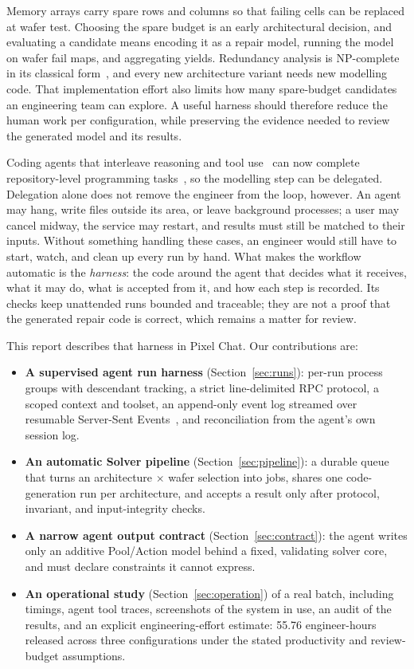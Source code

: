\documentclass[conference]{IEEEtran}
\begin{document}
Memory arrays carry spare rows and columns so that failing cells can be
replaced at wafer test. Choosing the spare budget is an early architectural
decision, and evaluating a candidate means encoding it as a repair model,
running the model on wafer fail maps, and aggregating yields. Redundancy
analysis is NP-complete in its classical form~\cite{kuo1987}, and every new
architecture variant needs new modelling code.
That implementation effort also limits how many spare-budget candidates an
engineering team can explore. A useful harness should therefore reduce the
human work per configuration, while preserving the evidence needed to
review the generated model and its results.

Coding agents that interleave reasoning and tool use~\cite{yao2023} can now
complete repository-level programming tasks~\cite{jimenez2024}, so the
modelling step can be delegated. Delegation alone does not remove the
engineer from the loop, however. An agent may hang, write files outside its
area, or leave background processes; a user may cancel midway, the service
may restart, and results must still be matched to their inputs. Without
something handling these cases, an engineer would still have to start,
watch, and clean up every run by hand. What makes the workflow automatic is
the \emph{harness}: the code around the agent that decides what it
receives, what it may do, what is accepted from it, and how each step is
recorded. Its checks keep unattended runs bounded and traceable; they are
not a proof that the generated repair code is correct, which remains a
matter for review.

This report describes that harness in Pixel Chat. Our contributions are:
\begin{itemize}
\item \textbf{A supervised agent run harness}
(Section~\ref{sec:runs}): per-run process groups with descendant tracking,
a strict line-delimited RPC protocol, a scoped context and toolset, an
append-only event log streamed over resumable Server-Sent
Events~\cite{sse}, and reconciliation from the agent's own session log.
\item \textbf{An automatic Solver pipeline} (Section~\ref{sec:pipeline}): a
durable queue that turns an architecture $\times$ wafer selection into jobs,
shares one code-generation run per architecture, and accepts a result only
after protocol, invariant, and input-integrity checks.
\item \textbf{A narrow agent output contract} (Section~\ref{sec:contract}):
the agent writes only an additive Pool/Action model behind a fixed,
validating solver core, and must declare constraints it cannot express.
\item \textbf{An operational study} (Section~\ref{sec:operation}) of a real
batch, including timings, agent tool traces, screenshots of the system in
use, an audit of the results, and an explicit engineering-effort estimate:
55.76 engineer-hours released across three configurations under the stated
productivity and review-budget assumptions.
\end{itemize}
\end{document}
